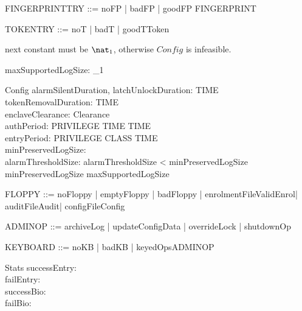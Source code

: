 \begin{zed}
FINGERPRINTTRY ::= noFP | badFP | goodFP \ldata FINGERPRINT \rdata
\end{zed}

\begin{zed}
TOKENTRY ::= noT | badT | goodT\ldata Token\rdata
\end{zed}

\begin{zed}
  [Audit]
\end{zed}

\The next constant must be $\nat_1$, otherwise $Config$ is infeasible.
\begin{axdef}
  maxSupportedLogSize: \nat_1
\end{axdef}

\begin{schema}{Config}
  alarmSilentDuration, latchUnlockDuration: TIME\\
  tokenRemovalDuration: TIME\\
  enclaveClearance: Clearance\\
  authPeriod: PRIVILEGE \fun  TIME \fun  \power  TIME\\
  entryPeriod: PRIVILEGE \fun  CLASS \fun  \power  TIME\\
  minPreservedLogSize: \nat \\
  alarmThresholdSize: \nat
\where
  alarmThresholdSize < minPreservedLogSize\\
  minPreservedLogSize \leq  maxSupportedLogSize
\end{schema}

\begin{zed}
FLOPPY ::= noFloppy | emptyFloppy | badFloppy | enrolmentFile\ldata ValidEnrol\rdata | auditFile\ldata \finset  Audit\rdata | configFile\ldata Config\rdata
\end{zed}

\begin{zed}
ADMINOP ::= archiveLog | updateConfigData | overrideLock | shutdownOp
\end{zed}

\begin{zed}
KEYBOARD ::= noKB | badKB | keyedOps\ldata ADMINOP\rdata
\end{zed}

\begin{schema}{Stats}
  successEntry: \nat \\
  failEntry: \nat \\
  successBio: \nat \\
  failBio: \nat
\end{schema}

